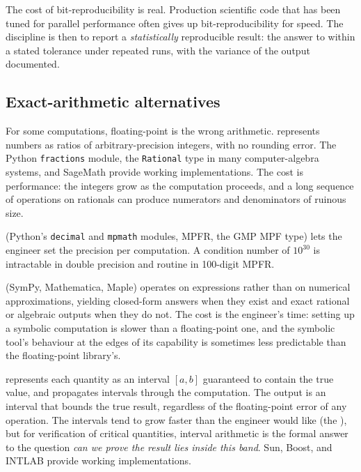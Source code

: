 The cost of bit-reproducibility is real. Production scientific code
that has been tuned for parallel performance often gives up
bit-reproducibility for speed. The discipline is then to report a
\emph{statistically} reproducible result: the answer to within a
stated tolerance under repeated runs, with the variance of the
output documented.

\subsection{Exact-arithmetic alternatives}

For some computations, floating-point is the wrong arithmetic.
 represents numbers as ratios
of arbitrary-precision integers, with no rounding error. The Python
\texttt{fractions} module, the \texttt{Rational} type in many
computer-algebra systems, and SageMath provide working
implementations. The cost is performance: the integers grow as the
computation proceeds, and a long sequence of operations on
rationals can produce numerators and denominators of ruinous size.

 (Python's
\texttt{decimal} and \texttt{mpmath} modules, MPFR, the GMP MPF
type) lets the engineer set the precision per computation. A
condition number of $10^{30}$ is intractable in double precision
and routine in 100-digit MPFR.

 (SymPy, Mathematica, Maple)
operates on expressions rather than on numerical approximations,
yielding closed-form answers when they exist and exact rational
or algebraic outputs when they do not. The cost is the engineer's
time: setting up a symbolic computation is slower than a
floating-point one, and the symbolic tool's behaviour at the
edges of its capability is sometimes less predictable than the
floating-point library's.

 represents each quantity as an
interval $[a, b]$ guaranteed to contain the true value, and
propagates intervals through the computation. The output is an
interval that bounds the true result, regardless of the
floating-point error of any operation. The intervals tend to grow
faster than the engineer would like (the ), but for verification of critical quantities, interval
arithmetic is the formal answer to the question \emph{can we
prove the result lies inside this band}. Sun, Boost, and INTLAB
provide working implementations.

